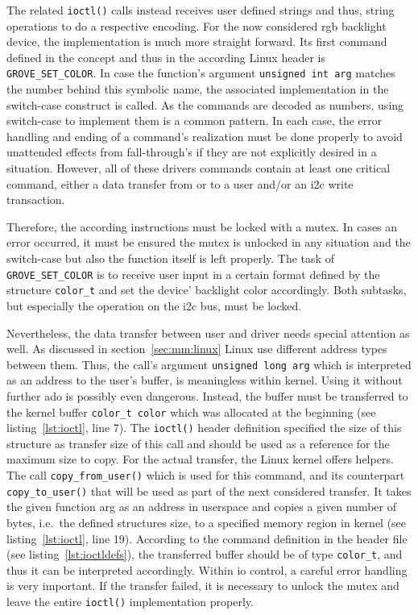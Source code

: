 The related \texttt{ioctl()} calls instead receives user defined strings and thus, string operations to do a respective encoding.
For the now considered \ac{rgb} backlight device, the implementation is much more straight forward.
Its first command defined in the concept and thus in the according Linux header is \texttt{GROVE_SET_COLOR}.
In case the function's argument \texttt{unsigned int arg} matches the number behind this symbolic name, the associated implementation in the switch-case construct is called.
As the commands are decoded as numbers, using switch-case to implement them is a common pattern.
In each case, the error handling and ending of a command's realization must be done properly to avoid unattended effects from fall-through's if they are not explicitly desired in a situation.
However, all of these drivers commands contain at least one critical command, either a data transfer from or to a user and/or an \ac{i2c} write transaction.

Therefore, the according instructions must be locked with a mutex.
In cases an error occurred, it must be ensured the mutex is unlocked in any situation and the switch-case but also the function itself is left properly.
The task of \texttt{GROVE_SET_COLOR} is to receive user input in a certain format defined by the structure \texttt{color_t} and set the device' backlight color accordingly.
Both subtasks, but especially the operation on the \ac{i2c} bus, must be locked.

Nevertheless, the data transfer between user and driver needs special attention as well.
As discussed in section~\ref{sec:mm:linux} Linux use different address types between them.
Thus, the call's argument \texttt{unsigned long arg} which is interpreted as an address to the user's buffer, is meaningless within kernel.
Using it without further ado is possibly even dangerous.
Instead, the buffer must be transferred to the kernel buffer \texttt{color_t color} which was allocated at the beginning (see listing~\ref{lst:ioctl}, line 7).
The \texttt{ioctl()} header definition specified the size of this structure as transfer size of this call and should be used as a reference for the maximum size to copy.
For the actual transfer, the Linux kernel offers helpers.
The call \texttt{copy_from_user()} which is used for this command, and its counterpart \texttt{copy_to_user()} that will be used as part of the next considered transfer.
It takes the given function arg as an address in userspace and copies a given number of bytes, i.e.\ the defined structures size, to a specified memory region in kernel (see listing~\ref{lst:ioctl}, line 19).
According to the command definition in the header file (see listing~\ref{lst:ioctldefs}), the transferred buffer should be of type \texttt{color_t}, and thus it can be interpreted accordingly.
Within \ac{io} control, a careful error handling is very important.
If the transfer failed, it is necessary to unlock the mutex and leave the entire \texttt{ioctl()} implementation properly.

